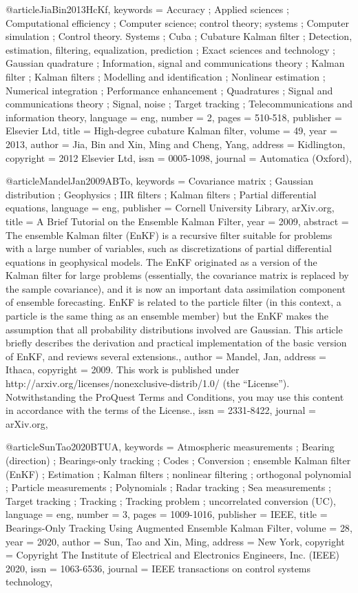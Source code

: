 @article{JiaBin2013HcKf,
keywords = {Accuracy ; Applied sciences ; Computational efficiency ; Computer science; control theory; systems ; Computer simulation ; Control theory. Systems ; Cuba ; Cubature Kalman filter ; Detection, estimation, filtering, equalization, prediction ; Exact sciences and technology ; Gaussian quadrature ; Information, signal and communications theory ; Kalman filter ; Kalman filters ; Modelling and identification ; Nonlinear estimation ; Numerical integration ; Performance enhancement ; Quadratures ; Signal and communications theory ; Signal, noise ; Target tracking ; Telecommunications and information theory},
language = {eng},
number = {2},
pages = {510-518},
publisher = {Elsevier Ltd},
title = {High-degree cubature Kalman filter},
volume = {49},
year = {2013},
author = {Jia, Bin and Xin, Ming and Cheng, Yang},
address = {Kidlington},
copyright = {2012 Elsevier Ltd},
issn = {0005-1098},
journal = {Automatica (Oxford)},
}

@article{MandelJan2009ABTo,
keywords = {Covariance matrix ; Gaussian distribution ; Geophysics ; IIR filters ; Kalman filters ; Partial differential equations},
language = {eng},
publisher = {Cornell University Library, arXiv.org},
title = {A Brief Tutorial on the Ensemble Kalman Filter},
year = {2009},
abstract = {The ensemble Kalman filter (EnKF) is a recursive filter suitable for problems with a large number of variables, such as discretizations of partial differential equations in geophysical models. The EnKF originated as a version of the Kalman filter for large problems (essentially, the covariance matrix is replaced by the sample covariance), and it is now an important data assimilation component of ensemble forecasting. EnKF is related to the particle filter (in this context, a particle is the same thing as an ensemble member) but the EnKF makes the assumption that all probability distributions involved are Gaussian. This article briefly describes the derivation and practical implementation of the basic version of EnKF, and reviews several extensions.},
author = {Mandel, Jan},
address = {Ithaca},
copyright = {2009. This work is published under http://arxiv.org/licenses/nonexclusive-distrib/1.0/ (the “License”). Notwithstanding the ProQuest Terms and Conditions, you may use this content in accordance with the terms of the License.},
issn = {2331-8422},
journal = {arXiv.org},
}

@article{SunTao2020BTUA,
keywords = {Atmospheric measurements ; Bearing (direction) ; Bearings-only tracking ; Codes ; Conversion ; ensemble Kalman filter (EnKF) ; Estimation ; Kalman filters ; nonlinear filtering ; orthogonal polynomial ; Particle measurements ; Polynomials ; Radar tracking ; Sea measurements ; Target tracking ; Tracking ; Tracking problem ; uncorrelated conversion (UC)},
language = {eng},
number = {3},
pages = {1009-1016},
publisher = {IEEE},
title = {Bearings-Only Tracking Using Augmented Ensemble Kalman Filter},
volume = {28},
year = {2020},
author = {Sun, Tao and Xin, Ming},
address = {New York},
copyright = {Copyright The Institute of Electrical and Electronics Engineers, Inc. (IEEE) 2020},
issn = {1063-6536},
journal = {IEEE transactions on control systems technology},
}

